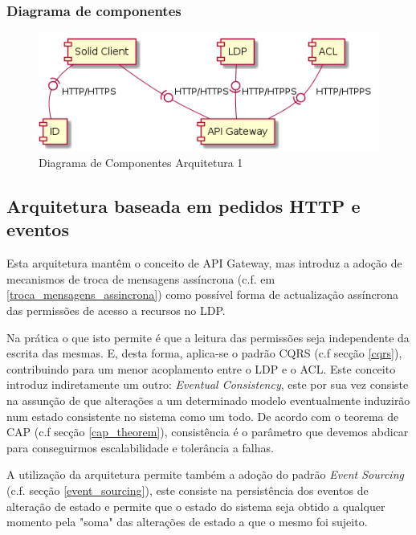 \subsubsection{Diagrama de componentes}
\begin{figure}[H]
    \begin{center}
    \includegraphics[width=1 \textwidth]{figures/component_diagram_2.png}
    \caption{Diagrama de Componentes Arquitetura 1}
    \end{center}
\end{figure}

\subsection{Arquitetura baseada em pedidos HTTP e eventos} \label{subsection:arquitetura_2}

Esta arquitetura mantêm o conceito de API Gateway, mas introduz a adoção de mecanismos de troca de mensagens assíncrona (c.f. em \ref{troca_mensagens_assincrona}) como possível forma de actualização assíncrona das permissões de acesso a recursos no LDP.

Na prática o que isto permite é que a leitura das permissões seja independente da escrita das mesmas. E, desta forma, aplica-se o padrão CQRS (c.f secção \ref{cqrs}), contribuindo para um menor acoplamento entre o LDP e o ACL. Este conceito introduz indiretamente um outro: \emph{Eventual Consistency}, este por sua vez consiste na assunção de que alterações a um determinado modelo eventualmente induzirão num estado consistente no sistema como um todo. De acordo com o teorema de CAP (c.f secção \ref{cap_theorem}), consistência é o parâmetro que devemos abdicar para conseguirmos escalabilidade e tolerância a falhas.

A utilização da arquitetura permite também a adoção do padrão \emph{Event Sourcing} (c.f. secção \ref{event_sourcing}), este consiste na persistência dos eventos de alteração de estado e permite que o estado do sistema seja obtido a qualquer momento pela "soma" das alterações de estado a que o mesmo foi sujeito.


